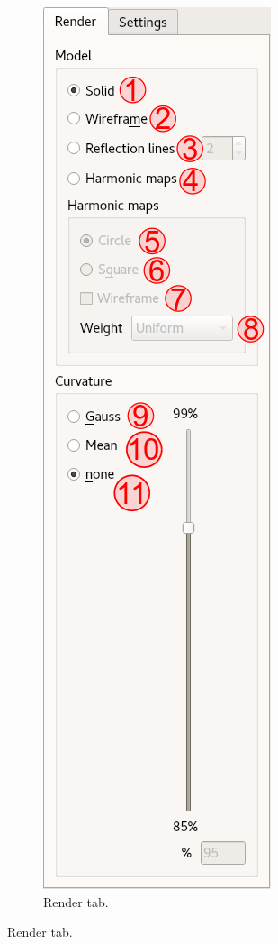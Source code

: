 \documentclass[12pt]{article}
\begin{document}
\hfill

\begin{figure}
	\vspace{-30pt}
	\begin{subfigure}{0.4\textwidth}
		\centering
		\includegraphics[scale=0.175]{SV-render}
		\caption{Render tab.}

\end{subfigure}
\end{figure}
\end{document}
